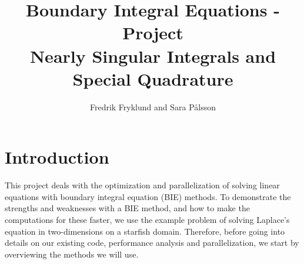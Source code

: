 \documentclass[a4paper,10pt]{article}
\title{Boundary Integral Equations - Project \\ Nearly Singular Integrals and Special Quadrature}
\author{Fredrik Fryklund and Sara P\aa lsson}
\begin{document}
\maketitle

\section*{Introduction}
This project deals with the optimization and parallelization of solving linear equations with boundary integral equation (BIE) methods. To demonstrate the strengths and weaknesses with a BIE method, and how to make the computations for these faster, we use the example problem of solving Laplace's equation in two-dimensions on a starfish domain. Therefore, before going  into details on our existing code, performance analysis and parallelization, we start by overviewing the methods we will use. 
\end{document}
